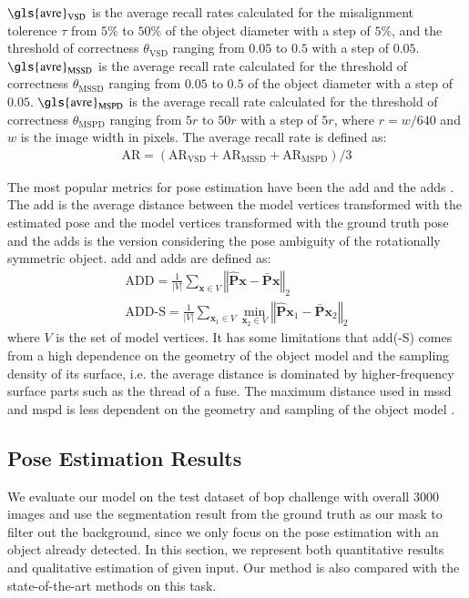 \documentclass[12pt,DIV14,BCOR12mm,a4paper,footinclude=false,headinclude,parskip=half-,twoside,openright,cleardoublepage=empty,toc=index,bibliography=totoc,listof=totoc]{scrreprt}
\numberwithin{equation}{chapter}
\begin{document}
$\text{\gls{avre}}_{\text{VSD}}$ is the average recall rates calculated for the misalignment tolerence $\tau$ from $5\%$ to $50\%$ of the object diameter with a step of $5\%$, and the threshold of correctness $\theta_{\text{VSD}}$ ranging from $0.05$ to $0.5$ with a step of $0.05$. $\text{\gls{avre}}_{\text{MSSD}}$ is the average recall rate calculated for the threshold of correctness $\theta_{\text{MSSD}}$ ranging from $0.05$ to $0.5$ of the object diameter with a step of $0.05$. $\text{\gls{avre}}_{\text{MSPD}}$ is the average recall rate calculated for the threshold of correctness $\theta_{\text{MSPD}}$ ranging from $5r$ to $50r$ with a step of $5r$, where $r=w/640$ and $w$ is the image width in pixels. The average recall rate is defined as:
\begin{align}
  \text{AR}=\left(\text{AR}_{\text{VSD}}+\text{AR}_{\text{MSSD}}+\text{AR}_{\text{MSPD}}\right)/3
\end{align}

The most popular metrics for pose estimation have been the \gls{add} and the \gls{adds} \cite{hinterstoisser2012model}. The \gls{add} is the average distance between the model vertices transformed with the estimated pose and the model vertices transformed with the ground truth pose and the \gls{adds} is the version considering the pose ambiguity of the rotationally symmetric object. \gls{add} and \gls{adds} are defined as:
\begin{gather}
  \text{ADD}=\frac{1}{\left|V\right|}\sum_{\mathbf{x}\in V}\left\Vert \hat{\mathbf{P}}\mathbf{x}-\bar{\mathbf{P}}\mathbf{x}\right\Vert _{2}\\
  \text{ADD-S}=\frac{1}{\left|V\right|}\sum_{\mathbf{x}_{1}\in V}\min_{\mathbf{x}_{2}\in V}\left\Vert \hat{\mathbf{P}}\mathbf{x}_{1}-\bar{\mathbf{P}}\mathbf{x}_{2}\right\Vert _{2}
\end{gather}
where $V$ is the set of model vertices. It has some limitations that \gls{add}(-S) comes from a high dependence on the geometry of the object model and the sampling density of its surface, i.e. the average distance is dominated by higher-frequency surface parts such as the thread of a fuse. The maximum distance used in \gls{mssd} and \gls{mspd} is less dependent on the geometry and sampling of the object model \cite{hodan2020bop}.

\subsection{Pose Estimation Results}
We evaluate our model on the test dataset of \gls{bop} challenge \cite{hodan2018bop} with overall 3000 images and use the segmentation result from the ground truth as our mask to filter out the background, since we only focus on the pose estimation with an object already detected. In this section, we represent both quantitative results and qualitative estimation of given input. Our method is also compared with the state-of-the-art methods on this task.
\end{document}
